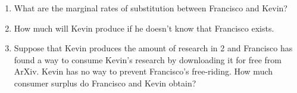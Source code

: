\documentclass[11pt]{article}
\begin{document}
\begin{enumerate}

\item What are the marginal rates of substitution between Francisco and Kevin?






\item How much will Kevin produce if he doesn't know that Francisco exists.


\item Suppose that Kevin produces the amount of research in 2 and Francisco has
found a way to consume Kevin's research by downloading it for free from ArXiv.
Kevin has no way to prevent Francisco's free-riding. How much consumer surplus
do Francisco and Kevin obtain?


\end{enumerate}
\end{document}
